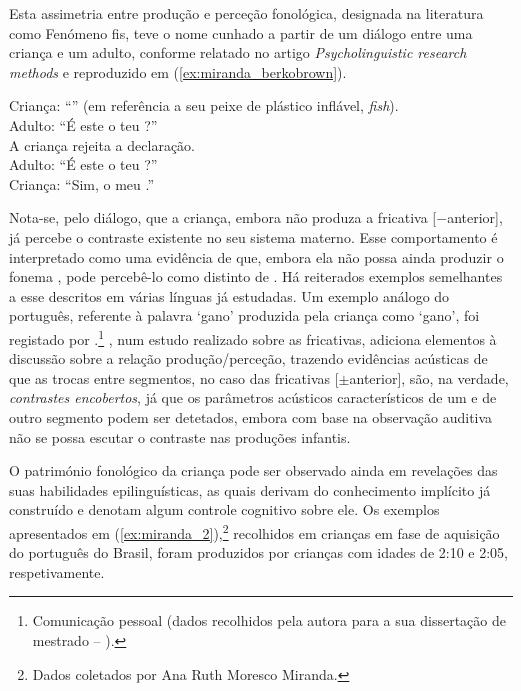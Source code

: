 \documentclass[output=paper]{LSP/langsci}
\begin{document}
Esta assimetria entre produção e perceção fonológica, designada na literatura como Fenómeno fis, teve o nome cunhado a partir de um diálogo entre uma criança e um adulto, conforme relatado no artigo \textit{Psycholinguistic research methods} \citep{berkobrown1960} e reproduzido em (\ref{ex:miranda_berkobrown}).

\ea\label{ex:miranda_berkobrown}
Criança: ``'' (em referência a seu peixe de plástico inflável, \textit{fish}).\\
Adulto: ``É este o teu ?''\\
A criança rejeita a declaração.\\
Adulto: ``É este o teu ?''\\
Criança: ``Sim, o meu .''
\z

Nota-se, pelo diálogo, que a criança, embora não produza a fricativa [$-$an\-te\-rior], já percebe o contraste existente no seu sistema materno. Esse comportamento é interpretado como uma evidência de que, embora ela não possa ainda produzir o fonema , pode percebê-lo como distinto de . Há reiterados exemplos semelhantes a esse descritos em várias línguas já estudadas. Um exemplo análogo do português, referente à palavra ‘gan\textipa{[S]}o’ produzida pela criança como ‘gan\textipa{[s]}o’, foi registado por \citet{matzenauer1988}.\footnote{Comunicação pessoal (dados recolhidos pela autora para a sua dissertação de mestrado – \citealt{matzenauer1988}).}
\citet{berti2006}, num estudo realizado sobre as fricativas, adiciona elementos à discussão sobre a relação produção/perceção, trazendo evidências acústicas de que as trocas entre segmentos, no caso das fricativas [$\pm$anterior], são, na verdade, \textit{contrastes encobertos}, já que os parâmetros acústicos característicos de um e de outro segmento podem ser detetados, embora com base na observação auditiva não se possa escutar o contraste nas produções infantis.

O património fonológico da criança pode ser observado ainda em revelações das suas habilidades epilinguísticas, as quais derivam do conhecimento implícito já construído e denotam algum controle cognitivo sobre ele. Os exemplos apresentados em (\ref{ex:miranda_2}),\footnote{Dados coletados por Ana Ruth Moresco Miranda.} recolhidos em crianças em fase de aquisição do português do Brasil, foram produzidos por crianças com idades de 2:10 e 2:05, respetivamente.
\end{document}
